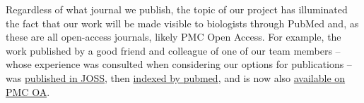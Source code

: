 Regardless of what journal we publish, the topic of our project has illuminated the fact that our work will be made visible to biologists through PubMed and, as these are all open-access journals, likely PMC Open Access. For example, the work published by a good friend and colleague of one of our team members -- whose experience was consulted when considering our options for publications -- was \href{https://joss.theoj.org/papers/10.21105/joss.01708}{published in JOSS}, then \href{https://pubmed.ncbi.nlm.nih.gov/32337477/}{indexed by pubmed}, and is now also \href{https://joss.theoj.org/papers/10.21105/joss.01708}{available on PMC OA}.